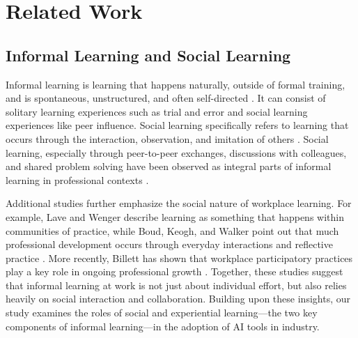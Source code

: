 \section{Related Work}
\subsection{Informal Learning and Social Learning}
Informal learning is learning that happens naturally, outside of formal training, and is spontaneous, unstructured, and often self-directed \cite{marsick1990informal, Eraut2004}. It can consist of solitary learning experiences such as trial and error and social learning experiences like peer influence. Social learning specifically refers to learning that occurs through the interaction, observation, and imitation of others \cite{Bandura1977}. Social learning, especially through peer-to-peer exchanges, discussions with colleagues, and shared problem solving have been observed as integral parts of informal learning in professional contexts \cite{Livingstone2001, Eraut2004}.

Additional studies further emphasize the social nature of workplace learning. For example, Lave and Wenger describe learning as something that happens within communities of practice, while Boud, Keogh, and Walker point out that much professional development occurs through everyday interactions and reflective practice \cite{Lave_Wenger_1991, boud1985reflection}. More recently, Billett has shown that workplace participatory practices play a key role in ongoing professional growth \cite{Billett2001}. Together, these studies suggest that informal learning at work is not just about individual effort, but also relies heavily on social interaction and collaboration. Building upon these insights, our study examines the roles of social and experiential learning—the two key components of informal learning—in the adoption of AI tools in industry. 





